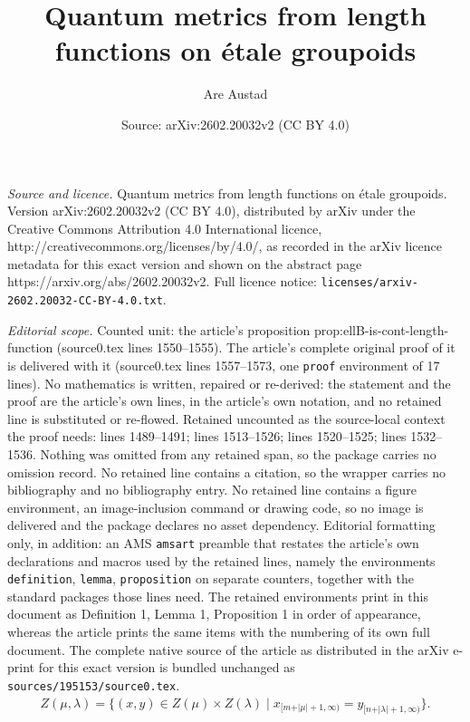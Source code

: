\documentclass[10pt,a4paper]{amsart}
\title{Quantum metrics from length functions on \'etale groupoids}
\author{Are Austad}
\date{Source: arXiv:2602.20032v2 (CC BY 4.0)}
\begin{document}
\maketitle

\noindent\emph{Source and licence.} Quantum metrics from length functions on \'etale groupoids. Version arXiv:2602.20032v2 (CC BY 4.0), distributed by arXiv under the Creative Commons Attribution 4.0 International licence, http://creativecommons.org/licenses/by/4.0/, as recorded in the arXiv licence metadata for this exact version and shown on the abstract page https://arxiv.org/abs/2602.20032v2. Full licence notice: \texttt{licenses/arxiv-2602.20032-CC-BY-4.0.txt}.\par\smallskip

\noindent\textit{Editorial scope.} Counted unit: the article's proposition prop:ellB-is-cont-length-function (source0.tex lines 1550--1555). The article's complete original proof of it is delivered with it (source0.tex lines 1557--1573, one \texttt{proof} environment of 17 lines). No mathematics is written, repaired or re-derived: the statement and the proof are the article's own lines, in the article's own notation, and no retained line is substituted or re-flowed.  Retained uncounted as the source-local context the proof needs: lines 1489--1491; lines 1513--1526; lines 1520--1525; lines 1532--1536.  Nothing was omitted from any retained span, so the package carries no omission record.  No retained line contains a citation, so the wrapper carries no bibliography and no bibliography entry.  No retained line contains a figure environment, an image-inclusion command or drawing code, so no image is delivered and the package declares no asset dependency.  Editorial formatting only, in addition: an AMS \texttt{amsart} preamble that restates the article's own declarations and macros used by the retained lines, namely the environments \texttt{definition}, \texttt{lemma}, \texttt{proposition} on separate counters, together with the standard packages those lines need.  The retained environments print in this document as Definition 1, Lemma 1, Proposition 1 in order of appearance, whereas the article prints the same items with the numbering of its own full document.  The complete native source of the article as distributed in the arXiv e-print for this exact version is bundled unchanged as \texttt{sources/195153/source0.tex}.
	\begin{align}\label{eq:def-cylinder-set}
		Z(\mu, \lambda) = \{ (x,y) \in Z(\mu) \times Z(\lambda) \mid x_{[m + \vert \mu \vert + 1, \infty)} = y_{[n + \vert \lambda \vert + 1 , \infty)} \}.
	\end{align}
\end{document}
